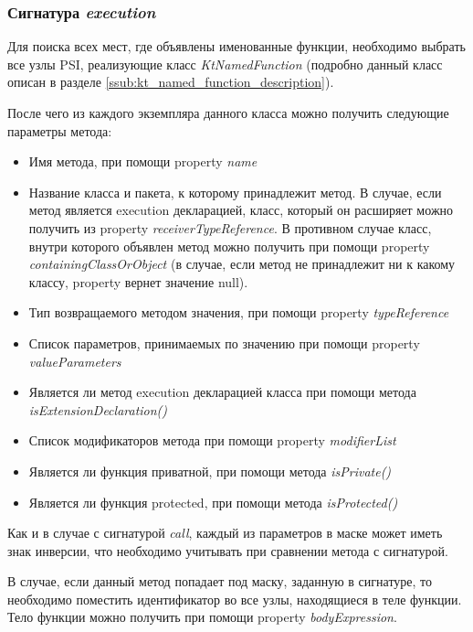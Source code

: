 \subsubsection{Сигнатура \textit{execution}}
\label{ssub:execution_signature}
Для поиска всех мест, где объявлены именованные функции, необходимо выбрать все
узлы PSI, реализующие класс \textit{KtNamedFunction} (подробно данный класс
описан в разделе \ref{ssub:kt_named_function_description}).

После чего из каждого экземпляра данного класса можно получить следующие параметры метода:
\begin{itemize}
	\item Имя метода, при помощи property \textit{name}
	\item Название класса и пакета, к которому принадлежит метод.
				В случае, если метод является execution декларацией, класс, который он
				расширяет можно получить из property \textit{receiverTypeReference}.
				В противном случае класс, внутри которого объявлен метод можно получить
				при	помощи property \textit{containingClassOrObject} (в случае, если
				метод не принадлежит ни к какому классу, property вернет значение null).
	\item Тип возвращаемого методом значения, при помощи property
				\textit{typeReference}
	\item Список параметров, принимаемых по значению при помощи property
				\textit{valueParameters}
	\item Является ли метод execution декларацией класса при помощи метода
				\textit{isExtensionDeclaration()}
	\item Список модификаторов метода при помощи property \textit{modifierList}
	\item Является ли функция приватной, при помощи метода \textit{isPrivate()}
	\item Является ли функция protected, при помощи метода \textit{isProtected()}
\end{itemize}

Как и в случае с сигнатурой \textit{call}, каждый из параметров в маске может
иметь знак инверсии, что необходимо учитывать при сравнении метода с сигнатурой.

В случае, если данный метод попадает под маску, заданную в сигнатуре, то
необходимо поместить идентификатор во все узлы, находящиеся в теле функции.
Тело функции можно получить при помощи property \textit{bodyExpression}.
